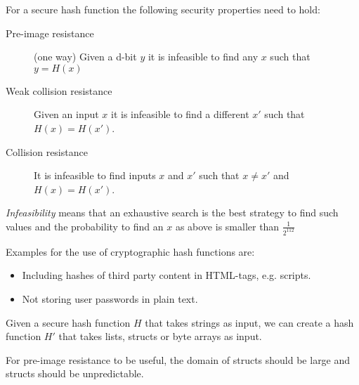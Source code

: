 


\begin{definition}
	For a secure hash function the following security properties need to hold:
	\begin{description}
		\item[Pre-image resistance] (one way) Given a d-bit $y$ it is infeasible to find any $x$ such that $y= H(x)$
		\item[Weak collision resistance] Given an input $x$ it is infeasible to find a different $x'$ such that $H(x) = H(x')$.
		\item[Collision resistance] It is infeasible to find inputs $x$ and $x'$
		such that $x \neq x'$ and $H(x)=H(x')$.
	\end{description}
	\emph{Infeasibility} means that an exhaustive search is the best strategy to find such values and the probability to find an $x$ as above is smaller than $\frac{1}{2^{112}}$
\end{definition}


\begin{example}
Examples for the use of cryptographic hash functions are:
\begin{itemize}
	\item Including hashes of third party content in HTML-tags, e.g. scripts.
	\item Not storing user passwords in plain text.
\end{itemize}
\end{example}


\begin{note}
Given a secure hash function $H$ that takes strings as input, we can create a hash function $H'$ that takes lists, structs or byte arrays as input.

For pre-image resistance to be useful, the domain of structs should be large and structs should be unpredictable.
\end{note}
